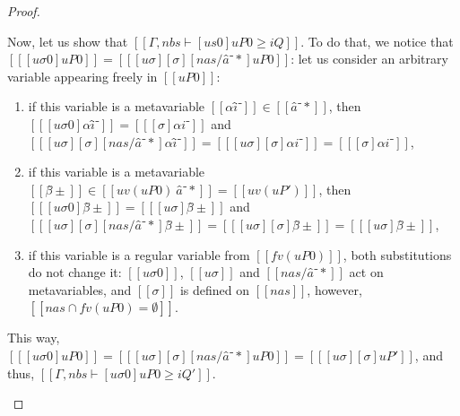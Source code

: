 \begin{proof}
\begin{caseof}
       Now, let us show that $[[Γ, nbs ⊢ [us0]uP0 ≥ iQ]]$.
       To do that, we notice that $[[ [uσ0]uP0 ]] = [[ [uσ][σ][nas/â⁻*]uP0 ]]$:
       let us consider an arbitrary variable appearing freely in $[[uP0]]$:
       \begin{enumerate}
        \item if this variable is a metavariable $[[αî⁻]] \in [[â⁻*]]$, then
        $[[ [uσ0]αî⁻ ]] = [[ [σ]αi⁻ ]]$ and 
        $[[ [uσ][σ][nas/â⁻*]αî⁻ ]] = [[ [uσ][σ]αi⁻ ]] = [[ [σ]αi⁻ ]]$,
        \item if this variable is a metavariable $[[β̂±]] \in [[ uv(uP0) \ {â⁻*} ]] = [[uv(uP')]]$, then
        $[[ [uσ0]β̂± ]] = [[ [uσ]β̂± ]]$ and $[[ [uσ][σ][nas/â⁻*]β̂± ]] = [[ [uσ][σ]β̂± ]] = [[ [uσ]β̂± ]]$,
        \item if this variable is a regular variable from $[[fv(uP0)]]$, both substitutions do not change it:
        $[[ uσ0 ]]$, $[[ uσ ]]$ and $[[ nas / â⁻* ]]$ act on metavariables, 
        and $[[σ]]$ is defined on $[[nas]]$, however, $[[{nas} ∩ fv(uP0) = ∅]]$.
       \end{enumerate}
       This way, $[[ [uσ0]uP0 ]] = [[ [uσ][σ][nas/â⁻*]uP0 ]] = [[ [uσ][σ]uP' ]]$,
       and thus, $[[ Γ, nbs ⊢ [uσ0]uP0 ≥ iQ' ]]$.


    \end{caseof}
\end{proof}
